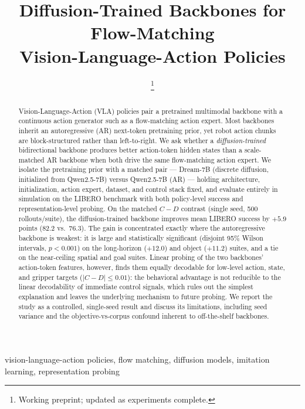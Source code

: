 \documentclass[conference]{IEEEtran}
\title{Diffusion-Trained Backbones for Flow-Matching\\
Vision-Language-Action Policies}
\author{\IEEEauthorblockN{Ryan Rahman}
\IEEEauthorblockA{University of Waterloo}
\thanks{Working preprint; updated as experiments complete.}}
\begin{document}
\maketitle

\begin{abstract}
Vision-Language-Action (VLA) policies pair a pretrained multimodal backbone with
a continuous action generator such as a flow-matching action expert. Most
backbones inherit an autoregressive (AR) next-token pretraining prior, yet robot
action chunks are block-structured rather than left-to-right. We ask whether a
\emph{diffusion-trained} bidirectional backbone produces better action-token
hidden states than a scale-matched AR backbone when both drive the same
flow-matching action expert. We isolate the pretraining prior with a matched pair
--- Dream-7B (discrete diffusion, initialized from Qwen2.5-7B) versus Qwen2.5-7B
(AR) --- holding architecture, initialization, action expert, dataset, and control
stack fixed, and evaluate entirely in simulation on the LIBERO benchmark with
both policy-level success and representation-level probing. On the matched $C-D$
contrast (single seed, 500 rollouts/suite), the diffusion-trained backbone improves
mean LIBERO success by $+5.9$ points (82.2 vs.\ 76.3). The gain is concentrated
exactly where the autoregressive backbone is weakest: it is large and statistically
significant (disjoint 95\% Wilson intervals, $p<0.001$) on the long-horizon
($+12.0$) and object ($+11.2$) suites, and a tie on the near-ceiling spatial and
goal suites. Linear probing of the two backbones' action-token features, however,
finds them equally decodable for low-level action, state, and gripper targets
($|C-D|\le0.01$): the behavioral advantage is not reducible to the linear
decodability of immediate control signals, which rules out the simplest
explanation and leaves the underlying mechanism to future probing. We report the study as a controlled, single-seed result and
discuss its limitations, including seed variance and the objective-vs-corpus
confound inherent to off-the-shelf backbones.
\end{abstract}

\begin{IEEEkeywords}
vision-language-action policies, flow matching, diffusion models, imitation
learning, representation probing
\end{IEEEkeywords}
\end{document}
